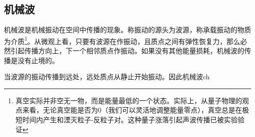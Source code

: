 
\subsection{机械波}
机械波是机械振动在空间中传播的现象。称振动的源头为波源，称承载振动的物质为介质\footnote{真空实际并非空无一物，而是能量最低的一个状态。实际上，从量子物理的观点来看，无论真空能是否为0（我们可以灵活地调整能量零点），真空总是在极短时间内产生和湮灭粒子-反粒子对。这种量子涨落引起声波传播已被实验验证}。从微观上看，只要有波源在作振动，且质点之间有弹性恢复力，那么必然引起传播方向上，下一个相邻质点作振动。如果没有其他能量损耗，机械波的传播是没有止境的。

当波源的振动传播到远处，远处质点从静止开始振动。因此机械波ch
